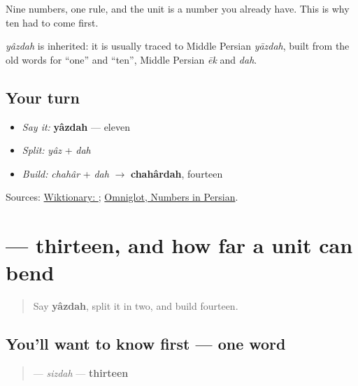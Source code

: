 Nine numbers, one rule, and the unit is a number you already have. This is why ten had to come first.

\begin{cousinweb}
\emph{yâzdah} is inherited: it is usually traced to Middle Persian \emph{yāzdah}, built from the old words for \textquotedblleft{}one\textquotedblright{} and \textquotedblleft{}ten\textquotedblright{}, Middle Persian \emph{ēk} and \emph{dah}.
\end{cousinweb}

\subsection*{Your turn}
\begin{itemize}
\raggedright
  \item \emph{Say it:} \textbf{yâzdah} — eleven
  \item \emph{Split:} \emph{yâz} + \emph{dah}
  \item \emph{Build:} \emph{chahâr} + \emph{dah} $\to$ \textbf{chahârdah}, fourteen
\end{itemize}

\begin{tcolorbox}[breakable,colback=teal!4,colframe=teal!35!black,title={Before you move on}]
Sources: \href{https://en.wiktionary.org/wiki/\%DB\%8C\%D8\%A7\%D8\%B2\%D8\%AF\%D9\%87}{Wiktionary: }; \href{https://www.omniglot.com/language/numbers/persian.htm}{Omniglot, Numbers in Persian}.
\end{tcolorbox}
\section[\texorpdfstring{\fa{سیزده} (sizdah)}{سیزده (sizdah)}]{ — thirteen, and how far a unit can bend}

\label{lesson:FA-C18-sizdah}



\begin{quote}
Say \textbf{yâzdah}, split it in two, and build fourteen.
\end{quote}

\subsection*{You'll want to know first — one word}
\begin{quote}
\textbf{} — \emph{sizdah} — \textbf{thirteen}
\end{quote}

